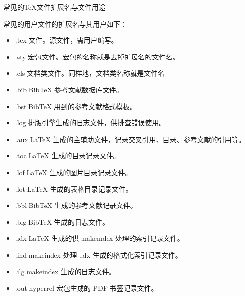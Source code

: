 \begin{faq}{常见的TeX文件扩展名与文件用途}

  常见的用户文件的扩展名与其用户如下：
  \begin{itemize}
    \item .tex 文件。源文件，需用户编写。
    \item .sty 宏包文件。宏包的名称就是去掉扩展名的文件名。
    \item .cls 文档类文件。同样地，文档类名称就是文件名
    \item .bib BibTeX 参考文献数据库文件。
    \item .bst BibTeX 用到的参考文献格式模板。
    \item .log 排版引擎生成的日志文件，供排查错误使用。
    \item .aux LaTeX 生成的主辅助文件，记录交叉引用、目录、参考文献的引用等。
    \item .toc LaTeX 生成的目录记录文件。
    \item .lof LaTeX 生成的图片目录记录文件。
    \item .lot LaTeX 生成的表格目录记录文件。
    \item .bbl BibTeX 生成的参考文献记录文件。
    \item .blg BibTeX 生成的日志文件。
    \item .idx LaTeX 生成的供 makeindex 处理的索引记录文件。
    \item .ind makeindex 处理 .idx 生成的格式化索引记录文件。
    \item .ilg makeindex 生成的日志文件。
    \item .out hyperref 宏包生成的 PDF 书签记录文件。
  \end{itemize}

\end{faq}

%
%
%
%
%
%
%
%
%

